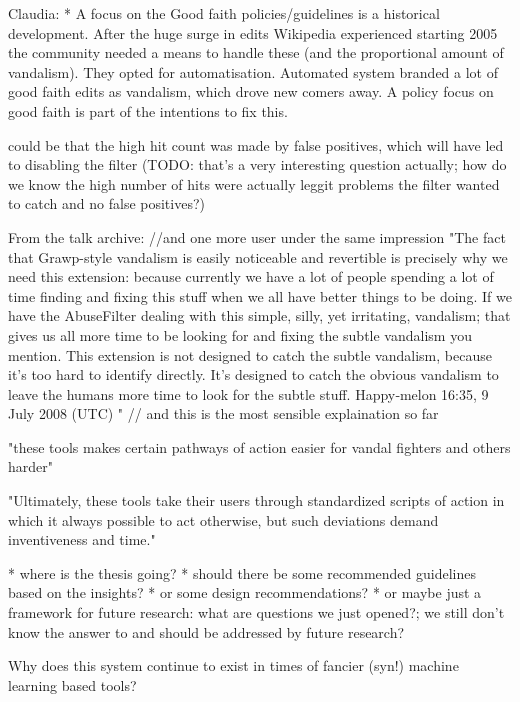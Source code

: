 Claudia: * A focus on the Good faith policies/guidelines is a historical development. After the huge surge in edits Wikipedia experienced starting 2005 the community needed a means to handle these (and the proportional amount of vandalism). They opted for automatisation. Automated system branded a lot of good faith edits as vandalism, which drove new comers away. A policy focus on good faith is part of the intentions to fix this.

 could be that the high hit count was made by false positives, which will have led to disabling the filter (TODO: that's a very interesting question actually; how do we know the high number of hits were actually leggit problems the filter wanted to catch and no false positives?)

 From the talk archive:
//and one more user under the same impression
"The fact that Grawp-style vandalism is easily noticeable and revertible is precisely why we need this extension: because currently we have a lot of people spending a lot of time finding and fixing this stuff when we all have better things to be doing. If we have the AbuseFilter dealing with this simple, silly, yet irritating, vandalism; that gives us all more time to be looking for and fixing the subtle vandalism you mention. This extension is not designed to catch the subtle vandalism, because it's too hard to identify directly. It's designed to catch the obvious vandalism to leave the humans more time to look for the subtle stuff. Happy‑melon 16:35, 9 July 2008 (UTC) "
// and this is the most sensible explaination so far
\cite{GeiRib2010}

"these tools makes certain pathways of action easier for vandal
fighters and others harder"

"Ultimately, these tools take their users
through standardized scripts of action in which it always
possible to act otherwise, but such deviations demand
inventiveness and time."

* where is the thesis going?
  * should there be some recommended guidelines based on the insights?
  * or some design recommendations?
  * or maybe just a framework for future research: what are questions we just opened?; we still don't know the answer to and should be addressed by future research?

Why does this system continue to exist in times of fancier (syn!) machine learning based tools?

